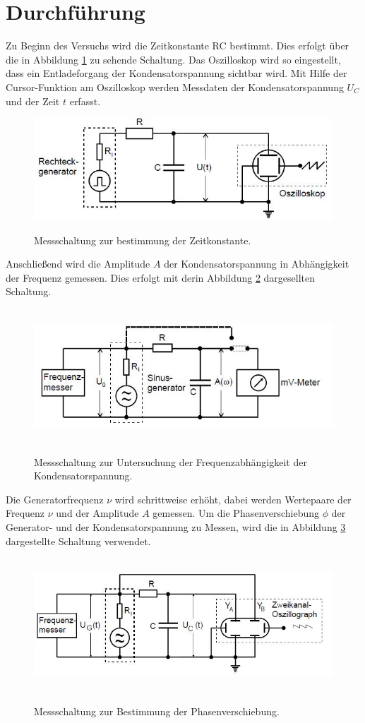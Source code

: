 \section{Durchführung}
Zu Beginn des Versuchs wird die Zeitkonstante RC bestimmt. Dies erfolgt über die in
Abbildung \ref{fig:RC2} zu sehende Schaltung. Das Oszilloskop wird so eingestellt, dass
ein Entladeforgang der Kondensatorspannung sichtbar wird. Mit Hilfe der
Cursor-Funktion am Oszilloskop werden Messdaten der Kondensatorspannung $U_{C}$ und
der Zeit $t$ erfasst.
\begin{figure}[H]
  \centering
  \includegraphics[width=13cm]{RC2.JPG}
  \caption{Messschaltung zur bestimmung der Zeitkonstante.}
  \cite{skript}
  \label{fig:RC2}
\end{figure}
\label{sec:Durchführung}
\noindent Anschließend wird die Amplitude $A$ der Kondensatorspannung in Abhängigkeit der
Frequenz gemessen. Dies erfolgt mit derin Abbildung \ref{fig:RC3} dargesellten Schaltung.
\begin{figure}[H]
  \centering
  \includegraphics[height=5cm]{RC3.JPG}
  \caption{Messschaltung zur Untersuchung der Frequenzabhängigkeit der Kondensatorspannung.}
  \cite{skript}
  \label{fig:RC3}
\end{figure}
\noindent Die Generatorfrequenz $\nu$ wird schrittweise erhöht, dabei werden Wertepaare der
Frequenz $\nu$ und der Amplitude $A$ gemessen.
Um die Phasenverschiebung $\phi$ der Generator- und der Kondensatorspannung zu Messen,
wird die in Abbildung \ref{fig:RC4} dargestellte Schaltung verwendet.
\begin{figure}[H]
  \centering
  \includegraphics[height=5cm]{RC4.JPG}
  \caption{Messschaltung zur Bestimmung der Phasenverschiebung.}
  \cite{skript}
  \label{fig:RC4}
\end{figure}

